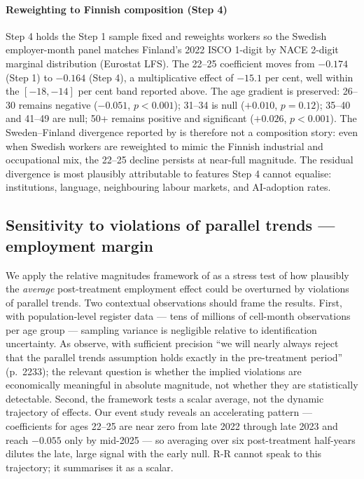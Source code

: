 \documentclass[preprint,12pt,authoryear]{elsarticle}
\begin{document}
\paragraph{Reweighting to Finnish composition (Step 4)} Step 4 holds the Step 1 sample fixed and reweights workers so the Swedish employer-month panel matches Finland's 2022 ISCO 1-digit by NACE 2-digit marginal distribution (Eurostat LFS). The 22--25 coefficient moves from $-0.174$ (Step 1) to $-0.164$ (Step 4), a multiplicative effect of $-15.1$ per cent, well within the $[-18, -14]$ per cent band reported above. The age gradient is preserved: 26--30 remains negative ($-0.051$, $p<0.001$); 31--34 is null ($+0.010$, $p=0.12$); 35--40 and 41--49 are null; 50+ remains positive and significant ($+0.026$, $p<0.001$). The Sweden--Finland divergence reported by \citet{kauhanen2026youth} is therefore not a composition story: even when Swedish workers are reweighted to mimic the Finnish industrial and occupational mix, the 22--25 decline persists at near-full magnitude. The residual divergence is most plausibly attributable to features Step 4 cannot equalise: institutions, language, neighbouring labour markets, and AI-adoption rates.


\subsection*{Sensitivity to violations of parallel trends --- employment margin}
\label{sec:rr_employment}

We apply the relative magnitudes framework of \citet{rambachan2023more} as a stress test of how plausibly the \emph{average} post-treatment employment effect could be overturned by violations of parallel trends. Two contextual observations should frame the results. First, with population-level register data --- tens of millions of cell-month observations per age group --- sampling variance is negligible relative to identification uncertainty. As \citet{roth2023trending} observe, with sufficient precision ``we will nearly always reject that the parallel trends assumption holds exactly in the pre-treatment period'' (p.~2233); the relevant question is whether the implied violations are economically meaningful in absolute magnitude, not whether they are statistically detectable. Second, the framework tests a scalar average, not the dynamic trajectory of effects. Our event study reveals an accelerating pattern --- coefficients for ages 22--25 are near zero from late 2022 through late 2023 and reach $-0.055$ only by mid-2025 --- so averaging over six post-treatment half-years dilutes the late, large signal with the early null. R-R cannot speak to this trajectory; it summarises it as a scalar.
\end{document}
